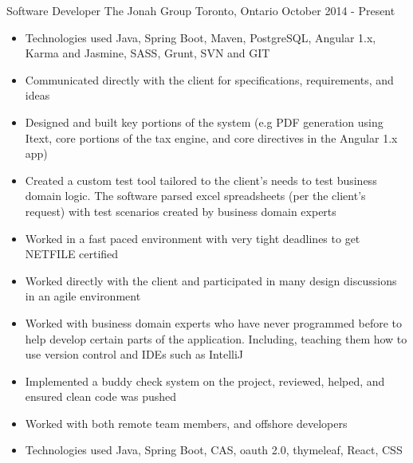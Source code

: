 
\begin{cventries}
    \cventry
    {Software Developer}
    {The Jonah Group}
    {Toronto, Ontario}
    {October 2014 - Present}
    {
        \renewcommand{\labelitemii}{\bullet}
        \begin{cvitems}
            \item[] {
                \begin{itemize}
                    \item {Technologies used Java, Spring Boot, Maven, PostgreSQL, Angular 1.x, Karma and Jasmine, SASS, Grunt, SVN and GIT}
                    \item {Communicated directly with the client for specifications, requirements, and ideas}
                    \item {Designed and built key portions of the system (e.g PDF generation using Itext, core portions of the tax engine, and core directives in the Angular 1.x app)}
                    \item {Created a custom test tool tailored to the client’s needs to test business domain logic. The software parsed excel spreadsheets
                            (per the client’s request) with test scenarios created by business domain experts}
                    \item {Worked in a fast paced environment with very tight deadlines to get NETFILE certified}
                    \item {Worked directly with the client and participated in many design discussions in an agile environment}
                    \item {Worked with business domain experts who have never programmed before to help develop certain parts of the application. Including, teaching them how to use version control and IDEs such as IntelliJ}
                    \item {Implemented a buddy check system on the project, reviewed, helped, and ensured clean code was pushed}
                    \item {Worked with both remote team members, and offshore developers}
                \end{itemize}
            }
            \item[] {
                \begin{itemize}
                    \item {Technologies used Java, Spring Boot, CAS, oauth 2.0, thymeleaf, React, CSS}

\end{itemize}}
\end{cvitems}}
\end{cventries}

